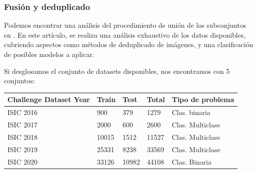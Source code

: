 \subsubsection{Fusión y deduplicado}

Podemos encontrar una análisis del procedimiento de unión de los subconjuntos en  \cite{CASSIDY2022102305}. En este artículo, se realiza una análisis exhaustivo de los datos disponibles, cubriendo aspectos como métodos de deduplicado de imágenes, y una clasificación de posibles modelos a aplicar.

Si desglosamos el conjunto de datasets disponibles, nos encontramos con 5 conjuntos:
\begin{table}[H]
	\centering
	\begin{tabular}{|l|l|l|l|l|}
		\hline
		\textbf{Challenge Dataset Year} & \textbf{Train} & \textbf{Test} & \textbf{Total} & \textbf{Tipo de problema } \\ \hline
		ISIC 2016 & 900 & 379 & 1279 & Clas. binaria  \\ \hline
		ISIC 2017 & 2000 & 600 & 2600 & Clas. Multiclase  \\ \hline
		ISIC 2018 & 10015 & 1512 & 11527 & Clas. Multiclase  \\ \hline
		ISIC 2019 & 25331 & 8238 & 33569 & Clas. Multiclase  \\ \hline
		ISIC 2020 & 33126 & 10982 & 44108 & Clas. Binaria  \\ \hline
	\end{tabular}
\end{table}

